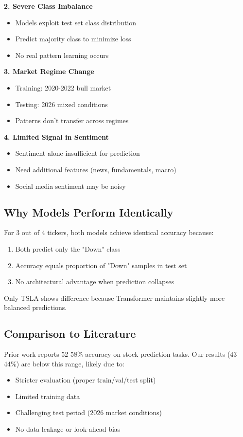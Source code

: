 \documentclass[10pt,twocolumn]{article}
\begin{document}
\textbf{2. Severe Class Imbalance}
\begin{itemize}
\item Models exploit test set class distribution
\item Predict majority class to minimize loss
\item No real pattern learning occurs
\end{itemize}

\textbf{3. Market Regime Change}
\begin{itemize}
\item Training: 2020-2022 bull market
\item Testing: 2026 mixed conditions
\item Patterns don't transfer across regimes
\end{itemize}

\textbf{4. Limited Signal in Sentiment}
\begin{itemize}
\item Sentiment alone insufficient for prediction
\item Need additional features (news, fundamentals, macro)
\item Social media sentiment may be noisy
\end{itemize}

\subsection{Why Models Perform Identically}

For 3 out of 4 tickers, both models achieve identical accuracy because:
\begin{enumerate}
\item Both predict only the "Down" class
\item Accuracy equals proportion of "Down" samples in test set
\item No architectural advantage when prediction collapses
\end{enumerate}

Only TSLA shows difference because Transformer maintains slightly more balanced predictions.

\subsection{Comparison to Literature}

Prior work reports 52-58\% accuracy on stock prediction tasks. Our results (43-44\%) are below this range, likely due to:
\begin{itemize}
\item Stricter evaluation (proper train/val/test split)
\item Limited training data
\item Challenging test period (2026 market conditions)
\item No data leakage or look-ahead bias
\end{itemize}
\end{document}
